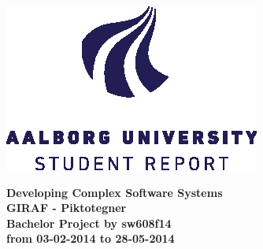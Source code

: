 \thispagestyle{empty} %
\begin{center}
	\includegraphics[scale=1]{media/aau-logo-vector}\\
	\vspace{0.25cm}
\end{center} 

\vspace{1cm}
\begin{center}
\textbf{\huge {Developing Complex Software Systems}} \\ \vspace{0.5cm}
\textbf{\Large {GIRAF - Piktotegner}} \\ \vspace{1cm}
\textbf{\large Bachelor Project by sw608f14}\\ \vspace{0.5cm}
\textbf{\normalsize from 03-02-2014 to 28-05-2014}\\
\end{center}

\vspace{0.25cm}


\thispagestyle{empty}

\newpage
\thispagestyle{empty}
\mbox{}


